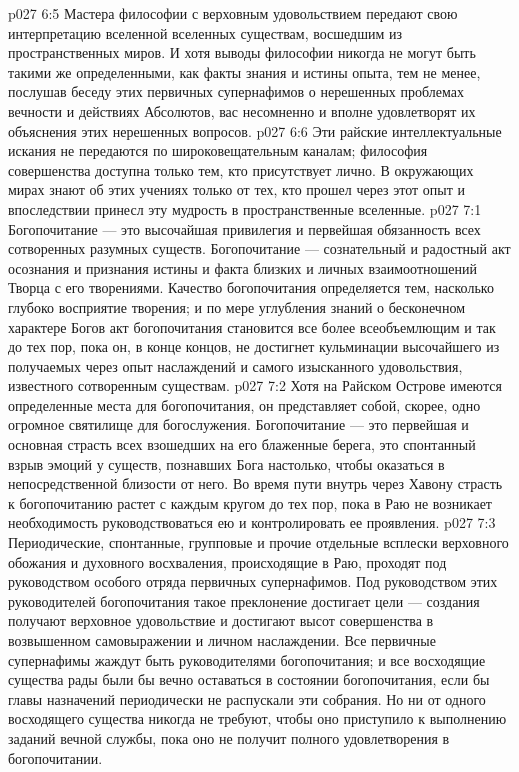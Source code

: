 \vs p027 6:5 Мастера философии с верховным удовольствием передают свою интерпретацию вселенной вселенных существам, восшедшим из пространственных миров. И хотя выводы философии никогда не могут быть такими же определенными, как факты знания и истины опыта, тем не менее, послушав беседу этих первичных супернафимов о нерешенных проблемах вечности и действиях Абсолютов, вас несомненно и вполне удовлетворят их объяснения этих нерешенных вопросов.
\vs p027 6:6 Эти райские интеллектуальные искания не передаются по широковещательным каналам; философия совершенства доступна только тем, кто присутствует лично. В окружающих мирах знают об этих учениях только от тех, кто прошел через этот опыт и впоследствии принесл эту мудрость в пространственные вселенные.
\vs p027 7:1 Богопочитание --- это высочайшая привилегия и первейшая обязанность всех сотворенных разумных существ. Богопочитание --- сознательный и радостный акт осознания и признания истины и факта близких и личных взаимоотношений Творца с его творениями. Качество богопочитания определяется тем, насколько глубоко восприятие творения; и по мере углубления знаний о бесконечном характере Богов акт богопочитания становится все более всеобъемлющим и так до тех пор, пока он, в конце концов, не достигнет кульминации высочайшего из получаемых через опыт наслаждений и самого изысканного удовольствия, известного сотворенным существам.
\vs p027 7:2 \pc Хотя на Райском Острове имеются определенные места для богопочитания, он представляет собой, скорее, одно огромное святилище для богослужения. Богопочитание --- это первейшая и основная страсть всех взошедших на его блаженные берега, это спонтанный взрыв эмоций у существ, познавших Бога настолько, чтобы оказаться в непосредственной близости от него. Во время пути внутрь через Хавону страсть к богопочитанию растет с каждым кругом до тех пор, пока в Раю не возникает необходимость руководствоваться ею и контролировать ее проявления.
\vs p027 7:3 Периодические, спонтанные, групповые и прочие отдельные всплески верховного обожания и духовного восхваления, происходящие в Раю, проходят под руководством особого отряда первичных супернафимов. Под руководством этих руководителей богопочитания такое преклонение достигает цели --- создания получают верховное удовольствие и достигают высот совершенства в возвышенном самовыражении и личном наслаждении. Все первичные супернафимы жаждут быть руководителями богопочитания; и все восходящие существа рады были бы вечно оставаться в состоянии богопочитания, если бы главы назначений периодически не распускали эти собрания. Но ни от одного восходящего существа никогда не требуют, чтобы оно приступило к выполнению заданий вечной службы, пока оно не получит полного удовлетворения в богопочитании.
